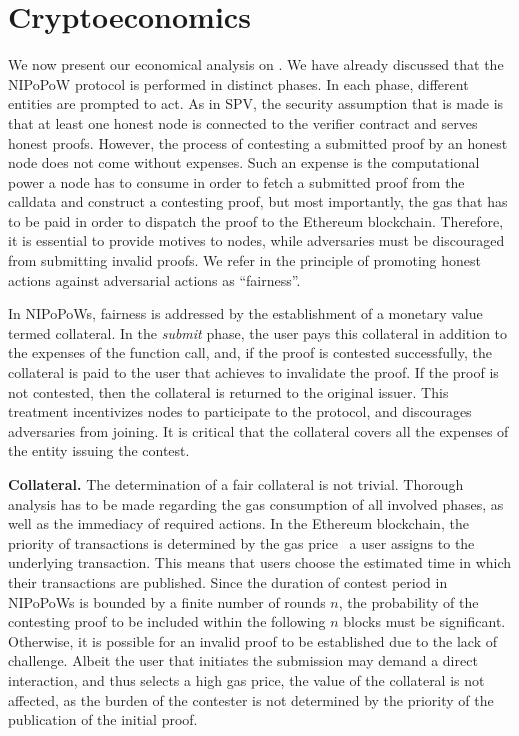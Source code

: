 \section{Cryptoeconomics}

We now present our economical analysis on \name. We have
already discussed that the NIPoPoW protocol is performed in distinct phases. In
each phase, different entities are prompted to act. As in SPV, the security
assumption that is made is that at least one honest node is connected to the
verifier contract and serves honest proofs. However, the process of contesting
a submitted proof by an honest node does not come without expenses.  Such an
expense is the computational power a node has to consume in order to fetch a
submitted proof from the calldata and construct a contesting proof, but most
importantly, the gas that has to be paid in order to dispatch the proof to
the Ethereum blockchain. Therefore, it is essential to provide motives to
nodes, while adversaries must be discouraged from
submitting invalid proofs.  We refer in the principle of promoting honest
actions against adversarial actions as ``fairness''.

In NIPoPoWs, fairness is addressed by the establishment of a monetary value
termed collateral. In the \emph{submit} phase, the user pays this collateral in
addition to the expenses of the function call, and, if the proof is contested
successfully, the collateral is paid to the user that achieves to invalidate
the proof. If the proof is not contested, then the collateral is returned to
the original issuer. This treatment incentivizes nodes to participate to the
protocol, and discourages adversaries from joining. It is critical that the
collateral covers all the expenses of the entity issuing the contest.

\noindent \textbf{Collateral.} The determination of a fair collateral is not
trivial. Thorough analysis has to be made regarding the gas consumption of
all involved phases, as well as the immediacy of required actions. In the
Ethereum blockchain, the priority of transactions is determined by the gas
price~\cite{wood} a user assigns to the underlying transaction. This means that
users choose the estimated time in which their transactions are published.
Since the duration of contest period in NIPoPoWs is bounded by a finite number
of rounds $n$, the probability of the contesting proof to be included within the
following $n$ blocks must be significant. Otherwise, it is possible for an invalid
proof to be established due to the lack of challenge. Albeit the user that
initiates the submission may demand a direct interaction, and thus selects a
high gas price, the value of the collateral is not affected, as the burden
of the contester is not determined by the priority of the publication of the initial
proof.

